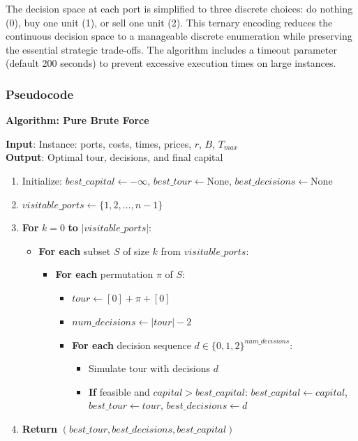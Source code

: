 \documentclass[12pt]{article}
\begin{document}
The decision space at each port is simplified to three discrete choices: do nothing (0), buy one unit (1), or sell one unit (2). This ternary encoding reduces the continuous decision space to a manageable discrete enumeration while preserving the essential strategic trade-offs. The algorithm includes a timeout parameter (default 200 seconds) to prevent excessive execution times on large instances.

\subsubsection{Pseudocode}

\textbf{Algorithm: Pure Brute Force}

\textbf{Input}: Instance: ports, costs, times, prices, $r$, $B$, $T_{max}$ \\
\textbf{Output}: Optimal tour, decisions, and final capital

\begin{enumerate}
    \item Initialize: $best\_capital \leftarrow -\infty$, $best\_tour \leftarrow \text{None}$, $best\_decisions \leftarrow \text{None}$
    \item $visitable\_ports \leftarrow \{1, 2, \ldots, n-1\}$
    \item \textbf{For} $k = 0$ \textbf{to} $|visitable\_ports|$:
    \begin{itemize}
        \item \textbf{For each} subset $S$ of size $k$ from $visitable\_ports$:
        \begin{itemize}
            \item \textbf{For each} permutation $\pi$ of $S$:
            \begin{itemize}
                \item $tour \leftarrow [0] + \pi + [0]$
                \item $num\_decisions \leftarrow |tour| - 2$
                \item \textbf{For each} decision sequence $d \in \{0,1,2\}^{num\_decisions}$:
                \begin{itemize}
                    \item Simulate tour with decisions $d$
                    \item \textbf{If} feasible and $capital > best\_capital$: $best\_capital \leftarrow capital$, $best\_tour \leftarrow tour$, $best\_decisions \leftarrow d$
                \end{itemize}
            \end{itemize}
        \end{itemize}
    \end{itemize}
    \item \textbf{Return} $(best\_tour, best\_decisions, best\_capital)$
\end{enumerate}
\end{document}
